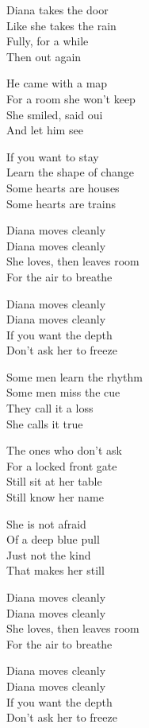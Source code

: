 \begin{lyrics}
Diana takes the door\\
Like she takes the rain\\
Fully, for a while\\
Then out again

He came with a map\\
For a room she won't keep\\
She smiled, said oui\\
And let him see

If you want to stay\\
Learn the shape of change\\
Some hearts are houses\\
Some hearts are trains

Diana moves cleanly\\
Diana moves cleanly\\
She loves, then leaves room\\
For the air to breathe

Diana moves cleanly\\
Diana moves cleanly\\
If you want the depth\\
Don't ask her to freeze

Some men learn the rhythm\\
Some men miss the cue\\
They call it a loss\\
She calls it true

The ones who don't ask\\
For a locked front gate\\
Still sit at her table\\
Still know her name

She is not afraid\\
Of a deep blue pull\\
Just not the kind\\
That makes her still

Diana moves cleanly\\
Diana moves cleanly\\
She loves, then leaves room\\
For the air to breathe

Diana moves cleanly\\
Diana moves cleanly\\
If you want the depth\\
Don't ask her to freeze


\end{lyrics}
